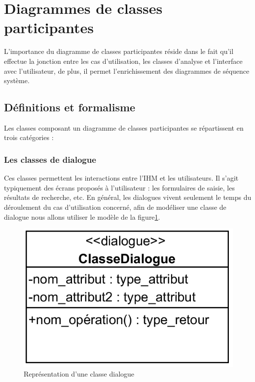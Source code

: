 \section{Diagrammes de classes participantes}
L’importance du diagramme de classes participantes réside dans le fait qu’il 
effectue la jonction entre les cas d’utilisation, les classes d’analyse et 
l’interface avec l’utilisateur, de plus, il permet l’enrichissement des 
diagrammes de séquence système.\cite{8}

\subsection{Définitions et formalisme}
Les classes composant un diagramme de classes participantes se répartissent 
en trois catégories :\cite{6}

\subsubsection{Les classes de dialogue}
Ces classes permettent les interactions entre l’IHM et les utilisateurs. 
Il s’agit typiquement des écrans proposés à l’utilisateur : les formulaires de 
saisie, les résultats de recherche, etc. En général, les dialogues vivent 
seulement le temps du déroulement du cas d’utilisation concerné, afin de 
modéliser une classe de dialogue nous allons utiliser le modèle de la 
figure\ref{fig20}.

\begin{figure}[h!]
    \centering
    \includegraphics[scale=1.5]{images/dialogue.png}
    \caption{Représentation d'une classe dialogue}
    \label{fig20}
\end{figure}
        
